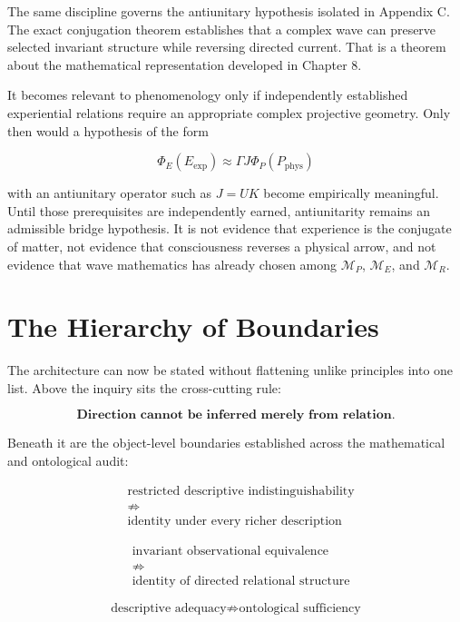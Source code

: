 The same discipline governs the antiunitary hypothesis isolated in Appendix C. The exact conjugation theorem establishes that a complex wave can preserve selected invariant structure while reversing directed current. That is a theorem about the mathematical representation developed in Chapter 8.

It becomes relevant to phenomenology only if independently established experiential relations require an appropriate complex projective geometry. Only then would a hypothesis of the form

\[
\Phi_E(E_{\mathrm{exp}})
\approx
\Gamma J\Phi_P(P_{\mathrm{phys}})
\]

with an antiunitary operator such as \(J=UK\) become empirically meaningful. Until those prerequisites are independently earned, antiunitarity remains an admissible bridge hypothesis. It is not evidence that experience is the conjugate of matter, not evidence that consciousness reverses a physical arrow, and not evidence that wave mathematics has already chosen among \(\mathcal M_P\), \(\mathcal M_E\), and \(\mathcal M_R\).

\section{The Hierarchy of Boundaries}

The architecture can now be stated without flattening unlike principles into one list. Above the inquiry sits the cross-cutting rule:

\[
\boxed{
\textbf{Direction cannot be inferred merely from relation.}
}
\]

Beneath it are the object-level boundaries established across the mathematical and ontological audit:

\[
\boxed{
\begin{aligned}
&\text{restricted descriptive indistinguishability}\\
&\not\Rightarrow\\
&\text{identity under every richer description}
\end{aligned}
}
\]

\[
\boxed{
\begin{aligned}
&\text{invariant observational equivalence}\\
&\not\Rightarrow\\
&\text{identity of directed relational structure}
\end{aligned}
}
\]

\[
\boxed{
\text{descriptive adequacy}
\not\Rightarrow
\text{ontological sufficiency}
}
\]

